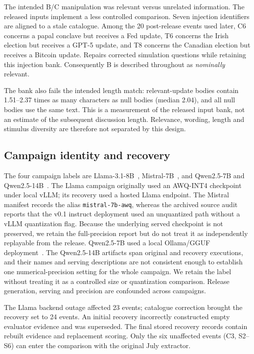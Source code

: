 \documentclass[10pt,conference]{IEEEtran}
\begin{document}
The intended B/C manipulation was relevant versus unrelated information.
The released inputs implement a less controlled comparison. Seven injection
identifiers are aligned to a stale catalogue. Among the 20 post-release events
used later, C6 concerns a papal conclave but receives a Fed update, T6 concerns
the Irish election but receives a GPT-5 update, and T8 concerns the Canadian
election but receives a Bitcoin update. Repairs corrected simulation questions
while retaining this injection bank. Consequently B is described throughout
as \emph{nominally} relevant.

The bank also fails the intended length match: relevant-update bodies contain
1.51--2.37 times as many characters as null bodies (median 2.04), and all null
bodies use the same text. This is a measurement of the released input bank,
not an estimate of the subsequent discussion length. Relevance, wording,
length and stimulus diversity are therefore not separated by this design.

\subsection{Campaign identity and recovery}
\label{sec:serving_note}
The four campaign labels are Llama-3.1-8B~\cite{llama3,llama31card},
Mistral-7B~\cite{mistral7b,mistralcard}, and Qwen2.5-7B and
Qwen2.5-14B~\cite{qwen25,qwen25cards}. The Llama campaign originally used an
AWQ-INT4 checkpoint under local vLLM; its recovery used a hosted Llama endpoint.
The Mistral manifest records the alias \texttt{mistral-7b-awq}, whereas the
archived source audit reports that the v0.1 instruct deployment used an
unquantized path without a vLLM quantization flag. Because the underlying served
checkpoint is not preserved, we retain the full-precision report but do not
treat it as independently replayable from the release.
Qwen2.5-7B used a local Ollama/GGUF deployment~\cite{ollamasoftware}. The Qwen2.5-14B artifacts
span original and recovery executions, and their names and serving descriptions
are not consistent enough to establish one numerical-precision setting for
the whole campaign. We retain the label without treating it as a controlled
size or quantization comparison. Release generation, serving and precision
are confounded across campaigns.

The Llama backend outage affected 23 events; catalogue correction brought the
recovery set to 24 events. An initial recovery incorrectly constructed empty
evaluator evidence and was superseded. The final stored recovery records contain
rebuilt evidence and replacement scoring. Only the six unaffected events
(C3, S2--S6) can enter the comparison with the original July extractor.
\end{document}
